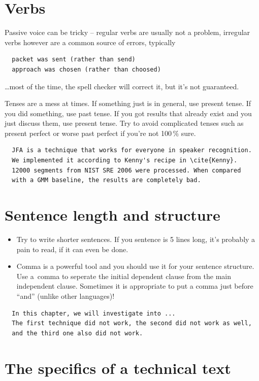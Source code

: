 \section*{Verbs}

Passive voice can be tricky -- regular verbs are usually not a problem, irregular verbs however are a common source of errors, typically
\begin{verbatim}
  packet was sent (rather than send)
  approach was chosen (rather than choosed)
\end{verbatim}
\noindent \ldots most of the time, the spell checker will correct it, but it's not guaranteed.

Tenses are a mess at times. If something just is in general, use present tense. If you did something, use past tense. If you got results that already exist and you just discuss them, use present tense. Try to avoid complicated tenses such as present perfect or worse past perfect if you're not 100\,\% sure.
\begin{verbatim}
  JFA is a technique that works for everyone in speaker recognition. 
  We implemented it according to Kenny's recipe in \cite{Kenny}. 
  12000 segments from NIST SRE 2006 were processed. When compared 
  with a GMM baseline, the results are completely bad. 
\end{verbatim}

\section*{Sentence length and structure}

\begin{itemize}
  \item{Try to write shorter sentences. If you sentence is 5 lines long, it's probably a pain to read, if it can even be done.}
  \item{Comma is a powerful tool and you should use it for your sentence structure. Use a~comma to seperate the initial dependent clause from the main independent clause. Sometimes it is appropriate to put a comma just before ``and'' (unlike other languages)!}
\end{itemize}
\begin{verbatim}
  In this chapter, we will investigate into ... 
  The first technique did not work, the second did not work as well, 
  and the third one also did not work. 
\end{verbatim}

\section*{The specifics of a technical text}

